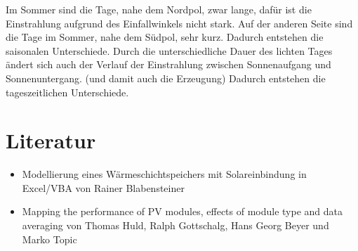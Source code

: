 \documentclass[a4paper,12pt]{article}
\begin{document}
	Im Sommer sind die Tage, nahe dem Nordpol, zwar lange, dafür ist die Einstrahlung aufgrund des Einfallwinkels nicht stark. Auf der anderen Seite sind die Tage im Sommer, nahe dem Südpol, sehr kurz. Dadurch entstehen die saisonalen Unterschiede.\newline
	Durch die unterschiedliche Dauer des lichten Tages ändert sich auch der Verlauf der Einstrahlung zwischen Sonnenaufgang und Sonnenuntergang. (und damit auch die Erzeugung) Dadurch entstehen die tageszeitlichen Unterschiede.
	\newpage
	\section{Literatur}
	\begin{itemize}
		\item Modellierung eines Wärmeschichtspeichers mit
		Solareinbindung in Excel/VBA von Rainer Blabensteiner
		\item Mapping the performance of PV modules, effects of module type and data averaging von Thomas Huld, Ralph Gottschalg, Hans Georg Beyer und Marko Topic
	\end{itemize}
	\newpage
	\listoffigures
\end{document}
